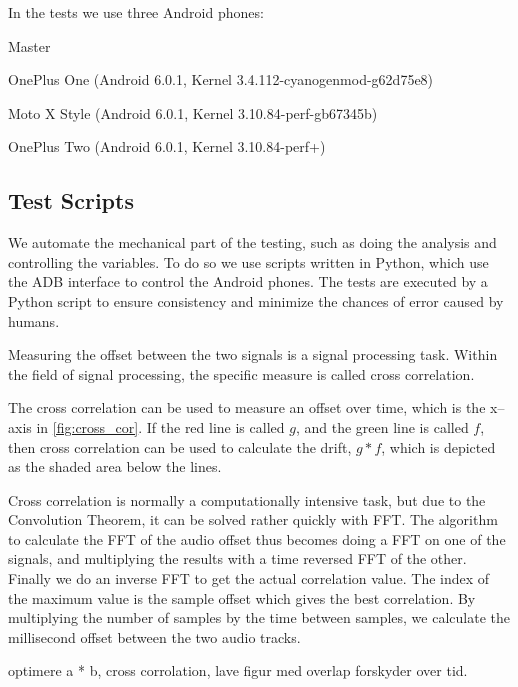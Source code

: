 In the tests we use three Android phones:
\begin{dankscription}{\bfseries}{Master}
	\item[Master]OnePlus One (Android 6.0.1, Kernel 3.4.112-cyanogenmod-g62d75e8)
	\item[Slave 1]Moto X Style (Android 6.0.1, Kernel 3.10.84-perf-gb67345b)
	\item[Slave 2]OnePlus Two (Android 6.0.1, Kernel 3.10.84-perf+)
\end{dankscription}

\subsection{Test Scripts}
We automate the mechanical part of the testing, such as doing the
analysis and controlling the variables. To do so we use scripts written
in Python, which use the \ac{ADB} interface to control the Android
phones. The tests are executed by a Python script to ensure
consistency and minimize the chances of error caused by humans.

Measuring the offset between the two signals is a signal processing
task. Within the field of signal processing, the specific measure is
called cross correlation. 

The cross correlation can be used to measure an offset over time, which is the x--axis in \cref{fig:cross_cor}.
If the red line is called $g$, and the green line is called $f$, then cross correlation can be used to calculate the drift, $g * f$,
which is depicted as the shaded area below the lines.

Cross correlation is normally
a computationally intensive task, but due to the Convolution
Theorem\cite{conv_theo}, it can be solved rather quickly with \ac{FFT}.
The algorithm to calculate the \ac{FFT} of the audio offset thus becomes
doing a \ac{FFT} on one of the signals, and multiplying the results with
a time reversed \ac{FFT} of the other. Finally we do an inverse \ac{FFT}
to get the actual correlation value. The index of the maximum value is
the sample offset which gives the best correlation. By multiplying the
number of samples by the time between samples, we calculate the
millisecond offset between the two audio tracks.



optimere a * b, cross corrolation, lave figur med overlap
forskyder over tid. 

